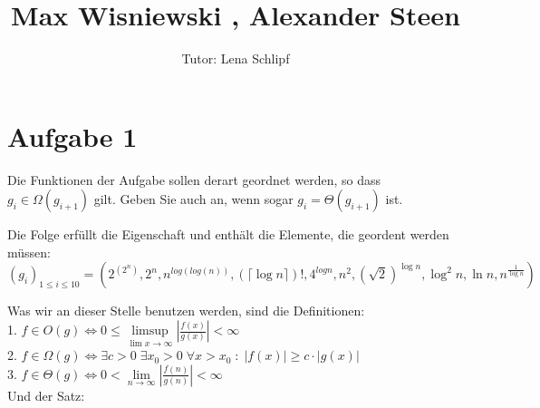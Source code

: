 \documentclass[11pt,a4paper,ngerman]{article}
\author{Tutor: Lena Schlipf}
\date{}
\title{Max Wisniewski , Alexander Steen}
\begin{document}

\maketitle
\thispagestyle{fancy}



\section*{Aufgabe 1}

Die Funktionen der Aufgabe sollen derart geordnet werden, so dass $ g_i \in \Omega (g_{i+1}) $ gilt. Geben Sie auch an, wenn sogar $ g_i = \Theta (g_{i+1}) $ ist. 

\vspace{12px}

Die Folge erfüllt die Eigenschaft und enthält die Elemente, die geordent werden müssen:\\


$$(g_i)_{1 \leq i \leq 10} = (2^{(2^n)}, 2^n  ,  n^{log{(log{(n)})}}, (\lceil \log{n} \rceil)!,  4^{log{n}} ,  n^2 ,  (\sqrt{2})^{\log{n}}  , \log^2{n}  ,  \ln{n}, n^{\frac{1}{\log{n}}})$$

Was wir an dieser Stelle benutzen werden, sind die Definitionen:\\

1. $f \in O (g) \Leftrightarrow 0 \leq \underset{\lim x \rightarrow \infty}{\limsup} \left| \frac{f(x)}{g(x)} \right| < \infty$\\
2. $f \in \Omega (g) \Leftrightarrow \exists c > 0 \; \exists x_0 > 0\; \forall x > x_0 \; : \; \left| f(x) \right| \geq c \cdot \left| g(x) \right|$\\
3. $f \in \Theta (g) \Leftrightarrow 0 < \underset{n \rightarrow \infty}{\lim} \left| \frac{f(n)}{g(n)} \right| < \infty$\\

Und der Satz:\\
\end{document}
